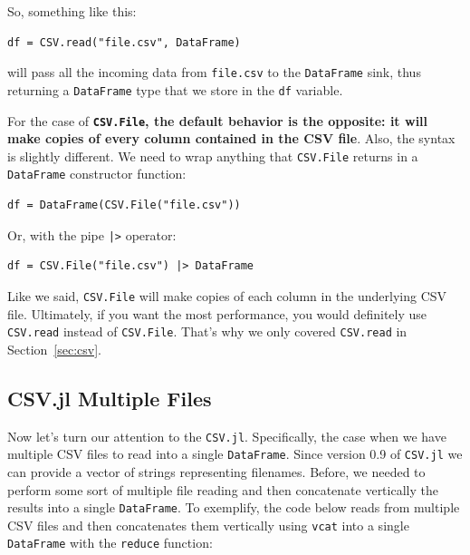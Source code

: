 \documentclass[
  notoc %
]{tufte-book}
\newcommand{\passthrough}[1]{#1}
\begin{document}
So, something like this:

\begin{lstlisting}
df = CSV.read("file.csv", DataFrame)
\end{lstlisting}

will pass all the incoming data from \passthrough{\lstinline!file.csv!}
to the \passthrough{\lstinline!DataFrame!} sink, thus returning a
\passthrough{\lstinline!DataFrame!} type that we store in the
\passthrough{\lstinline!df!} variable.

For the case of \textbf{\passthrough{\lstinline!CSV.File!}, the default
behavior is the opposite: it will make copies of every column contained
in the CSV file}. Also, the syntax is slightly different. We need to
wrap anything that \passthrough{\lstinline!CSV.File!} returns in a
\passthrough{\lstinline!DataFrame!} constructor function:

\begin{lstlisting}
df = DataFrame(CSV.File("file.csv"))
\end{lstlisting}

Or, with the pipe \passthrough{\lstinline!|>!} operator:

\begin{lstlisting}
df = CSV.File("file.csv") |> DataFrame
\end{lstlisting}

Like we said, \passthrough{\lstinline!CSV.File!} will make copies of
each column in the underlying CSV file. Ultimately, if you want the most
performance, you would definitely use \passthrough{\lstinline!CSV.read!}
instead of \passthrough{\lstinline!CSV.File!}. That's why we only
covered \passthrough{\lstinline!CSV.read!} in Section~\ref{sec:csv}.

\hypertarget{sec:df_performance_csv_multiple}{%
\subsection{CSV.jl Multiple
Files}\label{sec:df_performance_csv_multiple}}

Now let's turn our attention to the \passthrough{\lstinline!CSV.jl!}.
Specifically, the case when we have multiple CSV files to read into a
single \passthrough{\lstinline!DataFrame!}. Since version 0.9 of
\passthrough{\lstinline!CSV.jl!} we can provide a vector of strings
representing filenames. Before, we needed to perform some sort of
multiple file reading and then concatenate vertically the results into a
single \passthrough{\lstinline!DataFrame!}. To exemplify, the code below
reads from multiple CSV files and then concatenates them vertically
using \passthrough{\lstinline!vcat!} into a single
\passthrough{\lstinline!DataFrame!} with the
\passthrough{\lstinline!reduce!} function:
\end{document}
